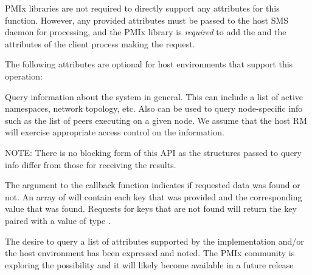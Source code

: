 \reqattrstart
\ac{PMIx} libraries are not required to directly support any attributes for this function. However, any provided attributes must be passed to the host \ac{SMS} daemon for processing, and the \ac{PMIx} library is \textit{required} to add the  and the  attributes of the client process making the request.

\reqattrend


\optattrstart
The following attributes are optional for host environments that support this operation:


\optattrend

\descr

Query information about the system in general.
This can include a list of active namespaces, network topology, etc.
Also can be used to query node-specific info such as the list of peers executing on a given node.
We assume that the host \ac{RM} will exercise appropriate access control on the information.

NOTE: There is no blocking form of this API as the structures passed to query info differ from those for receiving the results.

The  argument to the callback function indicates if requested data was found or not.
An array of  will contain each key that was provided and the corresponding value that was found. Requests for keys that are not found will return the key paired with a value of type .

\adviceuserstart
The desire to query a list of attributes supported by the implementation and/or the host environment has been expressed and noted. The \ac{PMIx} community is exploring the possibility and it will likely become available in a future release
\adviceuserend


